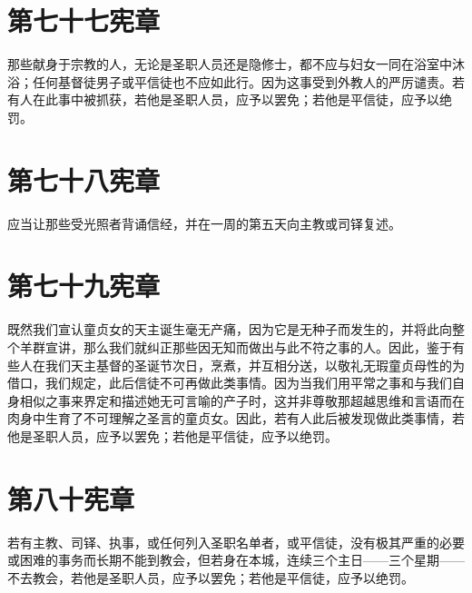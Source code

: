 
\section{第七十七宪章}

那些献身于宗教的人，无论是圣职人员还是隐修士，都不应与妇女一同在浴室中沐浴；任何基督徒男子或平信徒也不应如此行。因为这事受到外教人的严厉谴责。若有人在此事中被抓获，若他是圣职人员，应予以罢免；若他是平信徒，应予以绝罚。\par


\section{第七十八宪章}

应当让那些受光照者背诵信经，并在一周的第五天向主教或司铎复述。\par


\section{第七十九宪章}

既然我们宣认童贞女的天主诞生毫无产痛，因为它是无种子而发生的，并将此向整个羊群宣讲，那么我们就纠正那些因无知而做出与此不符之事的人。因此，鉴于有些人在我们天主基督的圣诞节次日，烹煮，并互相分送，以敬礼无瑕童贞母性的为借口，我们规定，此后信徒不可再做此类事情。因为当我们用平常之事和与我们自身相似之事来界定和描述她无可言喻的产子时，这并非尊敬那超越思维和言语而在肉身中生育了不可理解之圣言的童贞女。因此，若有人此后被发现做此类事情，若他是圣职人员，应予以罢免；若他是平信徒，应予以绝罚。\par


\section{第八十宪章}

若有主教、司铎、执事，或任何列入圣职名单者，或平信徒，没有极其严重的必要或困难的事务而长期不能到教会，但若身在本城，连续三个主日——三个星期——不去教会，若他是圣职人员，应予以罢免；若他是平信徒，应予以绝罚。\par

